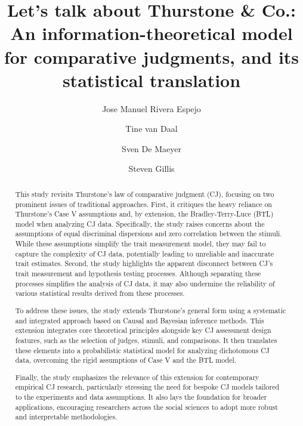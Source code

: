 \documentclass[
  authoryear,
  review,
  1p]{elsarticle}
\begin{document}
\begin{frontmatter}
\title{Let's talk about Thurstone \& Co.: An information-theoretical
model for comparative judgments, and its statistical translation}
\author[1]{Jose Manuel Rivera Espejo%
%
}
\author[1]{Tine van Daal%
%
}
\author[1]{Sven De Maeyer%
%
}
\author[2]{Steven Gillis%
%
}






        
\begin{abstract}
This study revisits Thurstone's law of comparative judgment (CJ),
focusing on two prominent issues of traditional approaches. First, it
critiques the heavy reliance on Thurstone's Case V assumptions and, by
extension, the Bradley-Terry-Luce (BTL) model when analyzing CJ data.
Specifically, the study raises concerns about the assumptions of equal
discriminal dispersions and zero correlation between the stimuli. While
these assumptions simplify the trait measurement model, they may fail to
capture the complexity of CJ data, potentially leading to unreliable and
inaccurate trait estimates. Second, the study highlights the apparent
disconnect between CJ's trait measurement and hypothesis testing
processes. Although separating these processes simplifies the analysis
of CJ data, it may also undermine the reliability of various statistical
results derived from these processes.

To address these issues, the study extends Thurstone's general form
using a systematic and integrated approach based on Causal and Bayesian
inference methods. This extension integrates core theoretical principles
alongside key CJ assessment design features, such as the selection of
judges, stimuli, and comparisons. It then translates these elements into
a probabilistic statistical model for analyzing dichotomous CJ data,
overcoming the rigid assumptions of Case V and the BTL model.

Finally, the study emphasizes the relevance of this extension for
contemporary empirical CJ research, particularly stressing the need for
bespoke CJ models tailored to the experiments and data assumptions. It
also lays the foundation for broader applications, encouraging
researchers across the social sciences to adopt more robust and
interpretable methodologies.
\end{abstract}






\end{frontmatter}
\end{document}

